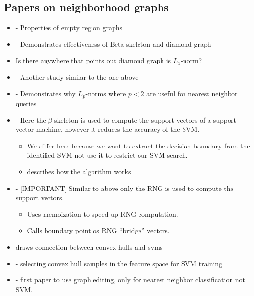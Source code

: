 \documentclass[12pt]{article}
\begin{document}
\subsection{Papers on neighborhood graphs}

\begin{itemize}
	\item \cite{CardinalColletteLangerman2009} - Properties of empty region
	graphs
	\item \cite{CorreaLindstrom2011} - Demonstrates effectiveness of Beta
	skeleton and diamond graph
	\item Is there anywhere that points out diamond graph is $L_1$-norm?
	\item \cite{MaljovecSahaLindstrom2013} - Another study similar to the one
	above
	\item \cite{AggarwalHinneburgKeim2001} - Demonstrates why $L_p$-norms where
	$p<2$ are useful for nearest neighbor queries
	\item \cite{ZhangKing2002b} - Here the $\beta$-skeleton is used to compute
	the support vectors of a support vector machine, however it reduces the
	accuracy of the SVM.
	\begin{itemize}
		\item We differ here because we want to extract the decision boundary
		from the identified SVM not use it to restrict our SVM search.
		\item \cite{ZhangKing2002a} describes how the algorithm works
	\end{itemize}
	\item \cite{GotoIshidaUchida2015} - [IMPORTANT] Similar to above only the RNG is used to
	compute the support vectors.
	\begin{itemize}
		\item Uses memoization to speed up RNG computation.
		\item Calls boundary point os RNG ``bridge'' vectors.
	\end{itemize}
	\item \cite{BennettBredensteiner2000} draws connection between convex hulls and svms
	\item \cite{ZengXuXie2008} - selecting convex hull samples in the feature space for SVM training
	\item \cite{BhattacharyaPoulsenToussaint1981} - first paper to use graph editing, only for nearest neighbor classification not SVM.
\end{itemize}

\end{document}
